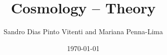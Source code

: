 \documentclass[a4paper]{article}
\title{Cosmology -- Theory}
\author{Sandro Dias Pinto Vitenti and Mariana Penna-Lima}
\date{\today}
\begin{document}
\maketitle

\nocite{Weinberg2008}
\nocite{Seager1999}
\nocite{Seager2000}
\nocite{Pequignot1991}
\nocite{Hummer1998}



\end{document}
